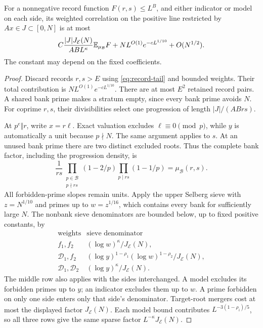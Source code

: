 \begin{lemma}\label{lem:envelope}
For a nonnegative record function \(F(r,s)\le L^B\), and either
indicator or model on each side, its weighted correlation on the
positive line restricted by \(Ax\in J\subset[0,N]\) is at most
\[
 C\frac{|J|J_{\mathcal E}(N)}{AB L^\kappa}\mathbb E_{\mu_{\mathcal B}}F
       +NL^{O(1)}e^{-cL^{1/10}}+O(N^{1/2}).
\]
The constant may depend on the fixed coefficients.
\end{lemma}
\begin{proof}
Discard records \(r,s>E\) using \eqref{eq:record-tail} and bounded
weights. Their total contribution is
\(NL^{O(1)}e^{-cL^{1/10}}\). There are at most \(E^2\) retained
record pairs. A shared bank prime makes a stratum empty, since every
bank prime avoids \(N\). For coprime \(r,s\), their divisibilities
select one progression of length \(|J|/(ABrs)\).

At \(p^e\Vert r\), write \(x=r\ell\). Exact valuation excludes
\(\ell\equiv0\pmod p\), while \(y\) is automatically a unit because
\(p\nmid N\). The same argument applies to \(s\). At an unused bank
prime there are two distinct excluded roots. Thus the complete bank
factor, including the progression density, is
\[
 \frac1{rs}\prod_{\substack{p\in\mathcal B\\p\nmid rs}}(1-2/p)
             \prod_{p\mid rs}(1-1/p)
       =\mu_{\mathcal B}(r,s).
\]
All forbidden-prime slopes remain units. Apply the upper Selberg
sieve with \(z=N^{1/10}\) and primes up to \(w=z^{1/16}\),
which contains every bank for sufficiently large \(N\).
The nonbank sieve denominators are bounded below, up to fixed positive
constants, by
\[
\begin{array}{c|c}
 \text{weights}&\text{sieve denominator}\\ \hline
 f_1,f_2&(\log w)^\kappa/J_{\mathcal E}(N),\\
 \mathcal D_1,f_2&
   (\log y)^{1-\rho_1}(\log w)^{1-\rho_2}/J_{\mathcal E}(N),\\
 \mathcal D_1,\mathcal D_2&
   (\log y)^\kappa/J_{\mathcal E}(N).
\end{array}
\]
The middle row also applies with the sides interchanged.
A model excludes its forbidden primes up to \(y\); an indicator
excludes them up to \(w\). A prime forbidden on only one side enters
only that side's denominator. Target-root mergers cost at most the
displayed factor \(J_{\mathcal E}(N)\). Each model bound contributes
\(L^{-3(1-\rho_i)/5}\), so all three rows give the same sparse
factor \(L^{-\kappa}J_{\mathcal E}(N)\).


\end{proof}
